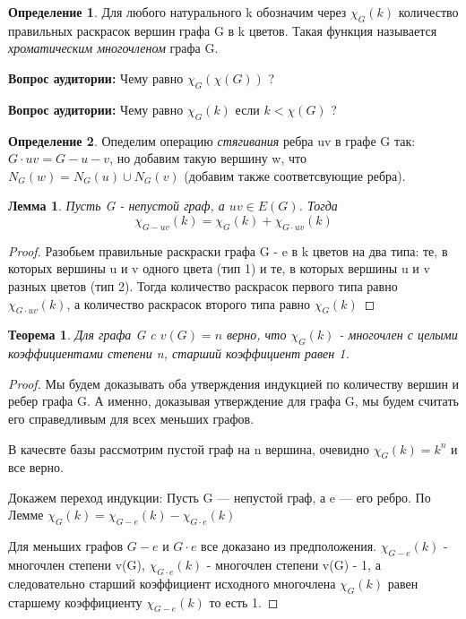 \documentclass{article}
\newtheorem{theorem}{Теорема}
\newtheorem{lemma}{Лемма}
\theoremstyle{definition}
\newtheorem{definition}{Определение}[section]
\newcommand{\question}{\textbf{Вопрос аудитории: }}
\theoremstyle{remark}
\begin{document}
\begin{definition}
    Для любого натурального k обозначим через $\chi_G(k)$ количество правильных раскрасок вершин графа G в k цветов. Такая функция называется \textit{хроматическим многочленом} графа G.
\end{definition}

\question Чему равно $\chi_G(\chi(G))$ ? 


\question Чему равно $\chi_G(k)$ если $k < \chi(G)$ ? 

\begin{definition}
    Опеделим операцию \textit{стягивания} ребра uv в графе G так: $G\cdot uv = G - u - v$, но добавим такую вершину w, что $N_G(w) = N_G(u) \cup N_G(v)$ (добавим также соответсвующие ребра).
\end{definition}

\begin{lemma} 
    Пусть G - непустой граф, а $uv \in E(G)$. Тогда 
    $$
    \chi_{G-uv}(k) = \chi_G(k) + \chi_{G\cdot uv}(k)
    $$ \label{lemma9}
\end{lemma}
\begin{proof}
    Разобьем правильные раскраски графа G - e в k цветов на два типа: те, в которых вершины u и
v одного цвета (тип 1) и те, в которых вершины u и v разных цветов (тип 2). Тогда количество раскрасок первого типа равно $\chi_{G\cdot uv}(k)$, а количество раскрасок второго типа равно $\chi_G(k)$ 
\end{proof}

\begin{theorem}
    Для графа G c $v(G) = n$ верно, что $\chi_G(k)$ - многочлен с целыми
коэффициентами степени n, старший коэффициент равен 1.
\end{theorem}
\begin{proof}
    Мы будем доказывать оба утверждения индукцией по количеству вершин и ребер графа G. А
именно, доказывая утверждение для графа G, мы будем считать его справедливым для всех меньших графов.

В качесвте базы рассмотрим пустой граф на n вершина, очевидно  $\chi_G(k) = k^n$ и все верно.

Докажем переход индукции: Пусть G — непустой граф, а e — его ребро. По
Лемме   $  \chi_G(k) =  \chi_{G-e}(k) - \chi_{G\cdot e}(k)$

Для меньших графов $G - e$ и $G\cdot e$ все доказано из предположения. 
$\chi_{G-e}(k)$ - многочлен степени v(G), $\chi_{G\cdot e}(k)$  - многочлен степени v(G) - 1,
а следовательно старший коэффициент исходного многочлена $ \chi_G(k) $ равен старшему коэффициенту $\chi_{G-e}(k)$ то есть 1. 
\end{proof}
\end{document}
